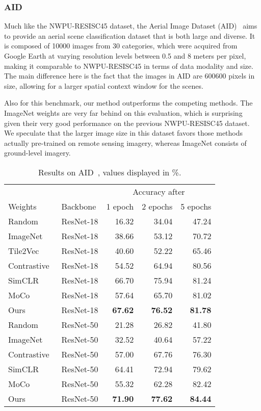 \documentclass[journal]{IEEEtran}
\begin{document}
\subsubsection{AID}
Much like the NWPU-RESISC45 dataset,
the Aerial Image Dataset (AID)~\cite{xia_aid_2017} aims to provide an aerial scene classification dataset
that is both large and diverse.
It is composed of 10000 images from 30 categories,
which were acquired from Google Earth at varying resolution levels between 0.5 and 8 meters per pixel,
making it comparable to NWPU-RESISC45 in terms of data modality and size.
The main difference here is the fact that the images in AID are 600600 pixels in size,
allowing for a larger spatial context window for the scenes.

Also for this benchmark, our method outperforms the competing methods.
The ImageNet weights are very far behind on this evaluation,
which is surprising given their very good performance on the previous NWPU-RESISC45 dataset.
We speculate that the larger image size in this dataset
favors those methods actually pre-trained on remote sensing imagery,
whereas ImageNet consists of ground-level imagery.

\begin{table}
  \center
  \caption{
    Results on AID~\cite{xia_aid_2017}, values displayed in \%.
  }\label{table:aid}
  \begin{tabular}{llrrr}
    \toprule
    &&\multicolumn{3}{c}{Accuracy after}\\
    Weights&Backbone&1 epoch&2 epochs&5 epochs\\
    \midrule
    Random                        & ResNet-18 & 16.32 & 34.04 & 47.24 \\
    ImageNet                      & ResNet-18 & 38.66 & 53.12 & 70.72 \\
    Tile2Vec~\cite{tile2vec}      & ResNet-18 & 40.60 & 52.22 & 65.46 \\
    Contrastive~\cite{simclr}     & ResNet-18 & 54.52 & 64.94 & 80.56 \\
    SimCLR~\cite{simclr}          & ResNet-18 & 66.70 & 75.94 & 81.24 \\
    MoCo~\cite{he_momentum_2020}  & ResNet-18 & 57.64 & 65.70 & 81.02 \\
    Ours                          & ResNet-18 & \textbf{67.62} & \textbf{76.52} & \textbf{81.78} \\
    \midrule
    Random                        & ResNet-50 & 21.28 & 26.82 & 41.80 \\
    ImageNet                      & ResNet-50 & 32.52 & 40.64 & 57.22 \\
    Contrastive~\cite{simclr}     & ResNet-50 & 57.00 & 67.76 & 76.30 \\
    SimCLR~\cite{simclr}          & ResNet-50 & 64.41 & 72.94 & 79.62 \\
    MoCo~\cite{he_momentum_2020}  & ResNet-50 & 55.32 & 62.28 & 82.42 \\
    Ours                          & ResNet-50 & \textbf{71.90} & \textbf{77.62} & \textbf{84.44} \\
    \bottomrule
  \end{tabular}
\end{table}
 
\end{document}
